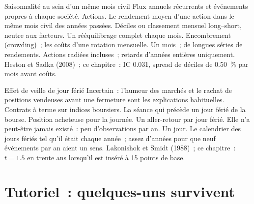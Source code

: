 \begin{strategyfile}{Saisonnalité au sein d'un même mois civil}\label{strat:s1:seasonality-and-calendar-effects:samemonth}
 Flux annuels récurrents et événements propres à chaque société.
 Actions.
 Le rendement moyen d'une action dans le même mois civil des années passées.
 Déciles ou classement mensuel long--short, neutre aux facteurs.
 Un rééquilibrage complet chaque mois.
 Encombrement (crowding)~; les coûts d'une rotation mensuelle.
 Un mois~; de longues séries de rendements.
 Actions radiées incluses~; retards d'années entières uniquement.
 Heston et Sadka (2008)~; ce chapitre~: IC 0.031, spread de déciles de 0.50~\% par mois avant coûts.
\end{strategyfile}

\begin{strategyfile}{Effet de veille de jour férié}\label{strat:s1:seasonality-and-calendar-effects:holiday}
 Incertain~: l'humeur des marchés et le rachat de positions vendeuses avant une fermeture sont les explications habituelles.
 Contrats à terme sur indices boursiers.
 La séance qui précède un jour férié de la bourse.
 Position acheteuse pour la journée.
 Un aller-retour par jour férié.
 Elle n'a peut-être jamais existé~: peu d'observations par an.
 Un jour.
 Le calendrier des jours fériés tel qu'il était chaque année~; assez d'années pour que neuf événements par an aient un sens.
 Lakonishok et Smidt (1988)~; ce chapitre~: $t = 1.5$ en trente ans lorsqu'il est inséré à 15 points de base.
\end{strategyfile}

\section{Tutoriel~: quelques-uns survivent}\label{tut:s1:seasonality-and-calendar-effects:tut}

